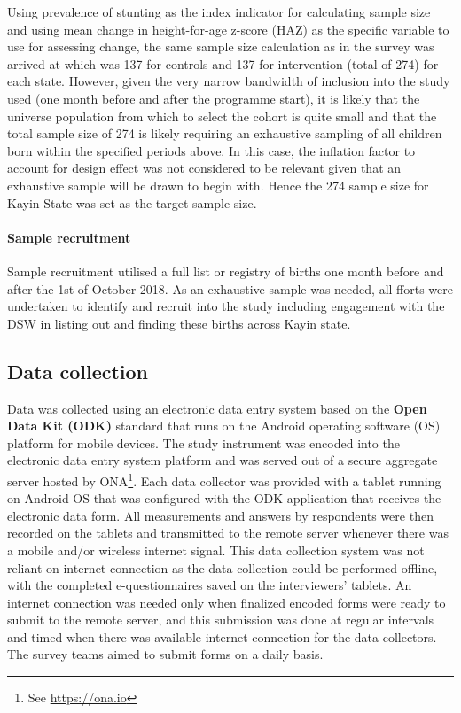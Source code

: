 \documentclass[12pt,a4paper]{article}
\let\oldparagraph\paragraph
\renewcommand{\paragraph}[1]{\oldparagraph{#1}\mbox{}}
\let\rmarkdownfootnote\footnote%
\def\footnote{\protect\rmarkdownfootnote}
\begin{document}
Using prevalence of stunting as the index indicator for calculating sample size and using mean change in height-for-age z-score (HAZ) as the specific variable to use for assessing change, the same sample size calculation as in the survey was arrived at which was 137 for controls and 137 for intervention (total of 274) for each state.
However, given the very narrow bandwidth of inclusion into the study used (one month before and after the programme start), it is likely that the universe population from which to select the cohort is quite small and that the total sample size of 274 is likely requiring an exhaustive sampling of all children born within the specified periods above. In this case, the inflation factor to account for design effect was not considered to be relevant given that an exhaustive sample will be drawn to begin with. Hence the 274 sample size for Kayin State was set as the target sample size.

\hypertarget{sample-recruitment}{%
\paragraph{Sample recruitment}\label{sample-recruitment}}

Sample recruitment utilised a full list or registry of births one month before and after the 1st of October 2018. As an exhaustive sample was needed, all fforts were undertaken to identify and recruit into the study including engagement with the DSW in listing out and finding these births across Kayin state.

\hypertarget{data-collection}{%
\subsection{Data collection}\label{data-collection}}

Data was collected using an electronic data entry system based on the \textbf{Open Data Kit (ODK)} standard that runs on the Android operating software (OS) platform for mobile devices. The study instrument was encoded into the electronic data entry system platform and was served out of a secure aggregate server hosted by ONA\footnote{See \url{https://ona.io}}. Each data collector was provided with a tablet running on Android OS that was configured with the ODK application that receives the electronic data form. All measurements and answers by respondents were then recorded on the tablets and transmitted to the remote server whenever there was a mobile and/or wireless internet signal. This data collection system was not reliant on internet connection as the data collection could be performed offline, with the completed e-questionnaires saved on the interviewers' tablets. An internet connection was needed only when finalized encoded forms were ready to submit to the remote server, and this submission was done at regular intervals and timed when there was available internet connection for the data collectors. The survey teams aimed to submit forms on a daily basis.
\end{document}
